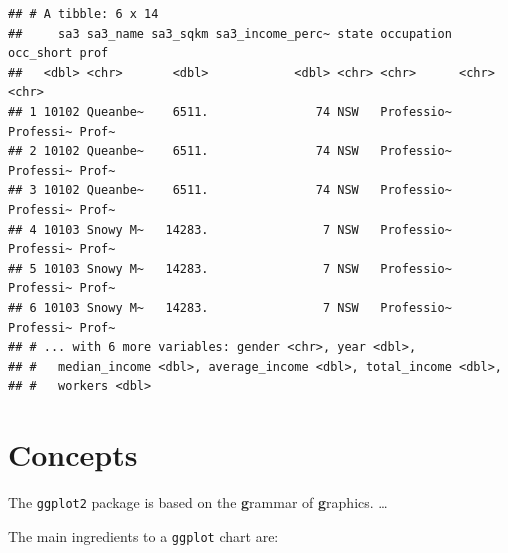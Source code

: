 \documentclass[]{book}
\newenvironment{Shaded}{\begin{snugshade}}{\end{snugshade}}
\newcommand{\CommentTok}[1]{\textcolor[rgb]{0.56,0.35,0.01}{\textit{#1}}}
\newcommand{\DecValTok}[1]{\textcolor[rgb]{0.00,0.00,0.81}{#1}}
\newcommand{\KeywordTok}[1]{\textcolor[rgb]{0.13,0.29,0.53}{\textbf{#1}}}
\newcommand{\NormalTok}[1]{#1}
\newcommand{\OperatorTok}[1]{\textcolor[rgb]{0.81,0.36,0.00}{\textbf{#1}}}
\newcommand{\StringTok}[1]{\textcolor[rgb]{0.31,0.60,0.02}{#1}}
\begin{document}
\begin{Shaded}
\end{Shaded}

\begin{verbatim}
## # A tibble: 6 x 14
##     sa3 sa3_name sa3_sqkm sa3_income_perc~ state occupation occ_short prof 
##   <dbl> <chr>       <dbl>            <dbl> <chr> <chr>      <chr>     <chr>
## 1 10102 Queanbe~    6511.               74 NSW   Professio~ Professi~ Prof~
## 2 10102 Queanbe~    6511.               74 NSW   Professio~ Professi~ Prof~
## 3 10102 Queanbe~    6511.               74 NSW   Professio~ Professi~ Prof~
## 4 10103 Snowy M~   14283.                7 NSW   Professio~ Professi~ Prof~
## 5 10103 Snowy M~   14283.                7 NSW   Professio~ Professi~ Prof~
## 6 10103 Snowy M~   14283.                7 NSW   Professio~ Professi~ Prof~
## # ... with 6 more variables: gender <chr>, year <dbl>,
## #   median_income <dbl>, average_income <dbl>, total_income <dbl>,
## #   workers <dbl>
\end{verbatim}

\hypertarget{concepts}{%
\section{Concepts}\label{concepts}}

The \texttt{ggplot2} package is based on the \textbf{g}rammar of \textbf{g}raphics. \ldots{}

The main ingredients to a \texttt{ggplot} chart are:
\end{document}
